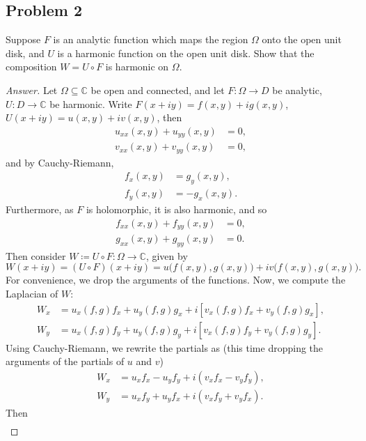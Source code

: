 \documentclass[12pt]{article}
\newcommand{\cx}{\mathbb{C}}
\newcommand\paren[1]{\left( #1 \right)}
\newcommand{\sqbrack}[1]{\left [ #1 \right ]}
\theoremstyle{definition}
\begin{document}
\subsection{Problem 2}
Suppose $F$ is an analytic function which maps the region $\Omega$ onto the open unit disk, and $U$ is a harmonic function on the open unit disk. Show that the composition $W = U \circ F$ is harmonic on $\Omega$.
\begin{proof}[Answer]
    Let $\Omega \subseteq \cx$ be open and connected, and let $F : \Omega \to D$ be analytic, $U : D \to \cx$ be harmonic. Write $F(x + iy) = f(x,y) + i g(x,y)$, $U(x + iy) = u(x,y) + i v(x,y)$, then
    \begin{align*}
        u_{xx}(x,y) + u_{yy}(x,y) & = 0, \\
        v_{xx}(x,y) + v_{yy}(x,y) & = 0,
    \end{align*}
    and by Cauchy-Riemann, 
    \begin{align*}
        f_{x}(x,y) & = g_{y}(x,y), \\
        f_{y}(x,y) & = -g_{x}(x,y).
    \end{align*}
    Furthermore, as $F$ is holomorphic, it is also harmonic, and so 
    \begin{align*}
        f_{xx}(x,y) + f_{yy}(x,y) & = 0, \\
        g_{xx}(x,y) + g_{yy}(x,y) & = 0.
    \end{align*}
    Then consider $W \coloneqq U \circ F : \Omega \to \cx $, given by 
    \[
        W(x + iy) = (U \circ F)(x + iy) = u \big( f(x,y) , g(x,y) \big) + i v \big( f(x,y) , g(x,y) \big).
    \]
    For convenience, we drop the arguments of the functions. Now, we compute the Laplacian of $W$:
    \begin{align*}
        W_x & = u_x ( f , g ) f_x + u_y ( f , g ) g_x + i \sqbrack{ v_x ( f , g ) f_x + v_y ( f , g ) g_x } , \\
        W_y & = u_x ( f , g ) f_y + u_y ( f , g ) g_y + i \sqbrack{ v_x ( f , g ) f_y + v_y ( f , g ) g_y } .
    \end{align*}
    Using Cauchy-Riemann, we rewrite the partials as (this time dropping the arguments of the partials of $u$ and $v$)
    \begin{align*}
        W_x & = u_x f_x - u_y f_y + i \paren{ v_x f_x - v_y f_y } , \\
        W_y & = u_x f_y + u_y f_x + i \paren{ v_x f_y + v_y f_x } .
    \end{align*}
    Then 
    \begin{align*}

\end{align*}
\end{proof}
\end{document}
